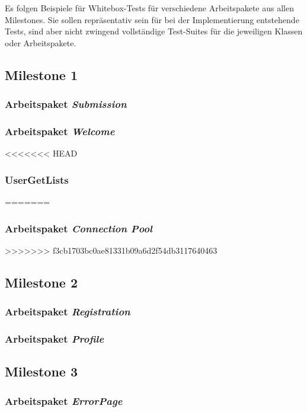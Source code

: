 \lstset{
    language=Java,
    basicstyle=\ttfamily\selectfont\scriptsize,
}

\newcommand{\testlisting}[1]{}

Es folgen Beispiele für Whitebox-Tests für verschiedene Arbeitspakete aus allen Milestones.
Sie sollen repräsentativ sein für bei der Implementierung entstehende Tests, sind aber nicht zwingend vollständige
Test-Suites für die jeweiligen Klassen oder Arbeitspakete.

\subsection{Milestone 1}\label{subsec:milestone1}

\subsubsection{Arbeitspaket \emph{Submission}}
\testlisting{SubmissionBackingTest}
\testlisting{SubmissionServiceTest}
\testlisting{SubmissionRepositoryTest}

\subsubsection{Arbeitspaket \emph{Welcome}}
\testlisting{LoginServiceTest}

<<<<<<< HEAD
\subsubsection{UserGetLists}
\testlisting{UserRepositoryGetListTest}
=======
\subsubsection{Arbeitspaket \emph{Connection Pool}}
\testlisting{TransactionTest}
>>>>>>> f3cb1703bc0ae81331b09a6d2f54db3117640463

\subsection{Milestone 2}\label{subsec:milestone2}

\subsubsection{Arbeitspaket \emph{Registration}}
\testlisting{PasswordValidatorTest}
\testlisting{RegistrationServiceTest}
\testlisting{UserRepositoryTest}

\subsubsection{Arbeitspaket \emph{Profile}}
\testlisting{ProfileBackingTest}
\subsection{Milestone 3}\label{subsec:milestone3}

\subsubsection{Arbeitspaket \emph{ErrorPage}}
\testlisting{ErrorPageBackingTest}
\testlisting{ErrorMessageTest}
